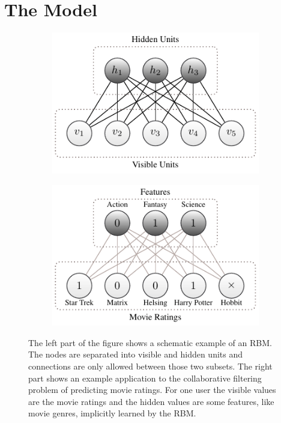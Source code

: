 \documentclass[crop=false,10pt]{standalone}
\begin{document}
  \section{The Model} %
  \label{sec:The Model}
    \begin{figure}[h]
      \center
      \begin{subfigure}[c]{0.49\textwidth}
        \center
        \includegraphics[scale=1.15]{figures/rbm-scheme-inputs.pdf}
      \end{subfigure}
      \begin{subfigure}[c]{0.49\textwidth}
        \center
        \includegraphics[scale=1.15]{figures/rbm-scheme-example.pdf}
      \end{subfigure}
      \caption{%
        The left part of the figure shows a schematic example of an RBM.
        The nodes are separated into visible and hidden units and connections are only allowed between those two subsets.
        The right part shows an example application to the collaborative filtering problem of predicting movie ratings.
        For one user the visible values are the movie ratings and the hidden values are some features, like movie genres, implicitly learned by the RBM.
      }
      \label{fig:rbm-scheme-and-example}
    \end{figure}
\end{document}
